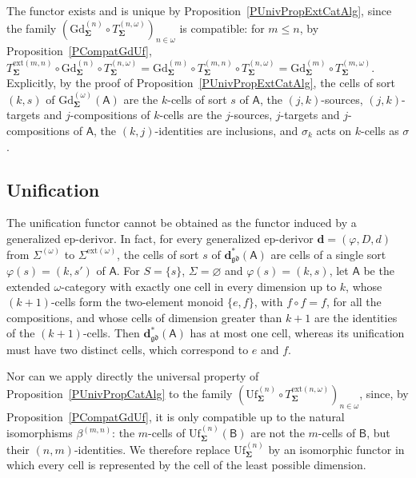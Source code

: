 \documentclass{amsart}
\theoremstyle{plain}
\theoremstyle{definition}
\begin{document}
The functor exists and is unique by Proposition~\ref{PUnivPropExtCatAlg}, since the family $(\mathrm{Gd}^{(n)}_{\mathbf{\Sigma}}\circ T^{(n,\omega)}_{\mathbf{\Sigma}})_{n\in\omega}$ is compatible: for $m\leq n$, by Proposition~\ref{PCompatGdUf}, $T^{\mathrm{ext}(m,n)}_{\mathbf{\Sigma}}\circ\mathrm{Gd}^{(n)}_{\mathbf{\Sigma}}\circ T^{(n,\omega)}_{\mathbf{\Sigma}}=\mathrm{Gd}^{(m)}_{\mathbf{\Sigma}}\circ T^{(m,n)}_{\mathbf{\Sigma}}\circ T^{(n,\omega)}_{\mathbf{\Sigma}}=\mathrm{Gd}^{(m)}_{\mathbf{\Sigma}}\circ T^{(m,\omega)}_{\mathbf{\Sigma}}$. Explicitly, by the proof of Proposition~\ref{PUnivPropExtCatAlg}, the cells of sort $(k,s)$ of $\mathrm{Gd}^{(\omega)}_{\mathbf{\Sigma}}(\boldsymbol{\mathsf{A}})$ are the $k$-cells of sort $s$ of $\boldsymbol{\mathsf{A}}$, the $(j,k)$-sources, $(j,k)$-targets and $j$-compositions of $k$-cells are the $j$-sources, $j$-targets and $j$-compositions of $\boldsymbol{\mathsf{A}}$, the $(k,j)$-identities are inclusions, and $\sigma_{k}$ acts on $k$-cells as $\sigma$.

\subsection{Unification}\label{SUfOmega}

The unification functor cannot be obtained as the functor induced by a generalized ep-derivor. In fact, for every generalized ep-derivor $\mathbf{d}=(\varphi,D,d)$ from $\Sigma^{(\omega)}$ to $\Sigma^{\mathrm{ext}(\omega)}$, the cells of sort $s$ of $\mathbf{d}^{\ast}_{\mathfrak{gd}}(\boldsymbol{\mathsf{A}})$ are cells of a single sort $\varphi(s)=(k,s')$ of $\boldsymbol{\mathsf{A}}$. For $S=\{s\}$, $\Sigma=\varnothing$ and $\varphi(s)=(k,s)$, let $\boldsymbol{\mathsf{A}}$ be the extended $\omega$-category with exactly one cell in every dimension up to $k$, whose $(k+1)$-cells form the two-element monoid $\{e,f\}$, with $f\circ f=f$, for all the compositions, and whose cells of dimension greater than $k+1$ are the identities of the $(k+1)$-cells. Then $\mathbf{d}^{\ast}_{\mathfrak{gd}}(\boldsymbol{\mathsf{A}})$ has at most one cell, whereas its unification must have two distinct cells, which correspond to $e$ and $f$.

Nor can we apply directly the universal property of Proposition~\ref{PUnivPropCatAlg} to the family $(\mathrm{Uf}^{(n)}_{\mathbf{\Sigma}}\circ T^{\mathrm{ext}(n,\omega)}_{\mathbf{\Sigma}})_{n\in\omega}$, since, by Proposition~\ref{PCompatGdUf}, it is only compatible up to the natural isomorphisms $\beta^{(m,n)}$: the $m$-cells of $\mathrm{Uf}^{(n)}_{\mathbf{\Sigma}}(\boldsymbol{\mathsf{B}})$ are not the $m$-cells of $\boldsymbol{\mathsf{B}}$, but their $(n,m)$-identities. We therefore replace $\mathrm{Uf}^{(n)}_{\mathbf{\Sigma}}$ by an isomorphic functor in which every cell is represented by the cell of the least possible dimension.
\end{document}
